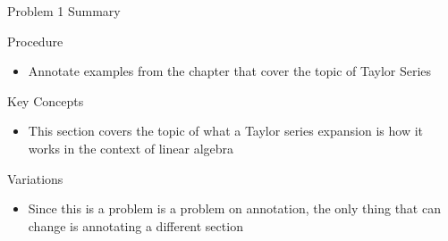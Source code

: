 \begin{summary}{Problem 1 Summary}
    \begin{statement}{Procedure}
        \begin{itemize}
            \item Annotate examples from the chapter that cover the topic of Taylor Series
        \end{itemize}
    \end{statement}
    \begin{statement}{Key Concepts}
        \begin{itemize}
            \item This section covers the topic of what a Taylor series expansion is how it works in the context of linear algebra
        \end{itemize}
    \end{statement}
    \begin{statement}{Variations}
        \begin{itemize}
            \item Since this is a problem is a problem on annotation, the only thing that can change is annotating a different section
        \end{itemize}
    \end{statement}
\end{summary}

